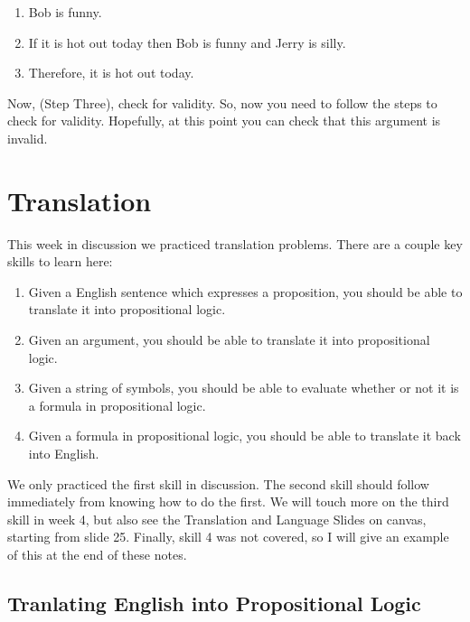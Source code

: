 \documentclass[
]{book}
\providecommand{\tightlist}{%
  \setlength{\itemsep}{0pt}\setlength{\parskip}{0pt}}
\begin{document}
\begin{enumerate}
\def\labelenumi{\arabic{enumi}.}
\tightlist
\item
  Bob is funny.
\item
  If it is hot out today then Bob is funny and Jerry is silly.
\item
  Therefore, it is hot out today.
\end{enumerate}

Now, (Step Three), check for validity. So, now you need to follow the steps to check for validity. Hopefully, at this point you can check that this argument is invalid.

\hypertarget{translation}{%
\chapter{Translation}\label{translation}}

This week in discussion we practiced translation problems. There are a couple key skills to learn here:

\begin{enumerate}
\def\labelenumi{\arabic{enumi}.}
\tightlist
\item
  Given a English sentence which expresses a proposition, you should be able to translate it into propositional logic.
\item
  Given an argument, you should be able to translate it into propositional logic.
\item
  Given a string of symbols, you should be able to evaluate whether or not it is a formula in propositional logic.
\item
  Given a formula in propositional logic, you should be able to translate it back into English.
\end{enumerate}

We only practiced the first skill in discussion. The second skill should follow immediately from knowing how to do the first. We will touch more on the third skill in week 4, but also see the Translation and Language Slides on canvas, starting from slide 25. Finally, skill 4 was not covered, so I will give an example of this at the end of these notes.

\hypertarget{tranlating-english-into-propositional-logic}{%
\section{Tranlating English into Propositional Logic}\label{tranlating-english-into-propositional-logic}}
\end{document}
